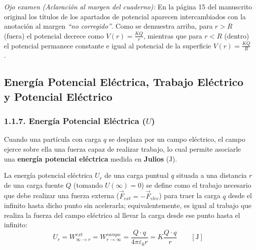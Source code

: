 \begin{ejercicio}
\begin{equation}
\end{equation}
\footnotesize\textit{Ojo examen (Aclaración al margen del cuaderno):} En la página 15 del manuscrito original los títulos de los apartados de potencial aparecen intercambiados con la anotación al margen \textit{``no corregido''}. Como se demuestra arriba, para $r > R$ (fuera) el potencial decrece como $V(r) = \frac{K Q}{r}$, mientras que para $r < R$ (dentro) el potencial permanece constante e igual al potencial de la superficie $V(r) = \frac{K Q}{R}$.
\end{ejercicio}

\subsection{Energía Potencial Eléctrica, Trabajo Eléctrico y Potencial Eléctrico}

\subsubsection{1.1.7. Energía Potencial Eléctrica ($U$)}
Cuando una partícula con carga $q$ se desplaza por un campo eléctrico, el campo ejerce sobre ella una fuerza capaz de realizar trabajo, lo cual permite asociarle una \textbf{energía potencial eléctrica} medida en \textbf{Julios} ($\si{\joule}$).

\begin{definicion}
La energía potencial eléctrica $U_r$ de una carga puntual $q$ situada a una distancia $r$ de una carga fuente $Q$ (tomando $U(\infty) = 0$) se define como el trabajo necesario que debe realizar una fuerza externa ($\vec{F}_{ext} = -\vec{F}_{elec}$) para traer la carga $q$ desde el infinito hasta dicho punto sin acelerarla; equivalentemente, es igual al trabajo que realiza la fuerza del campo eléctrico al llevar la carga desde ese punto hasta el infinito:
\begin{equation}
    U_r = W_{\infty \to r}^{ext} = W_{r \to \infty}^{campo} = \frac{Q \cdot q}{4\pi\varepsilon_0 r} = K \frac{Q \cdot q}{r} \qquad [\si{\joule}]
\end{equation}
\end{definicion}

